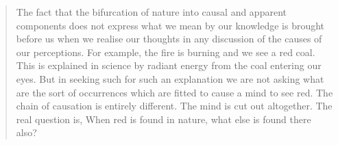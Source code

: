 \blockquote{The fact that the bifurcation of nature into causal and apparent components does not express what we mean by our knowledge is brought before us when we realise our thoughts in any discussion of the causes of our perceptions. For example, the fire is burning and we see a red coal. This is explained in science by radiant energy from the coal entering our eyes. But in seeking such for such an explanation we are not asking what are the sort of occurrences which are fitted to cause a mind to see red. The chain of causation is entirely different. The mind is cut out altogether. The real question is, When red is found in nature, what else is found there also?\cite[27]{whitehead}}
